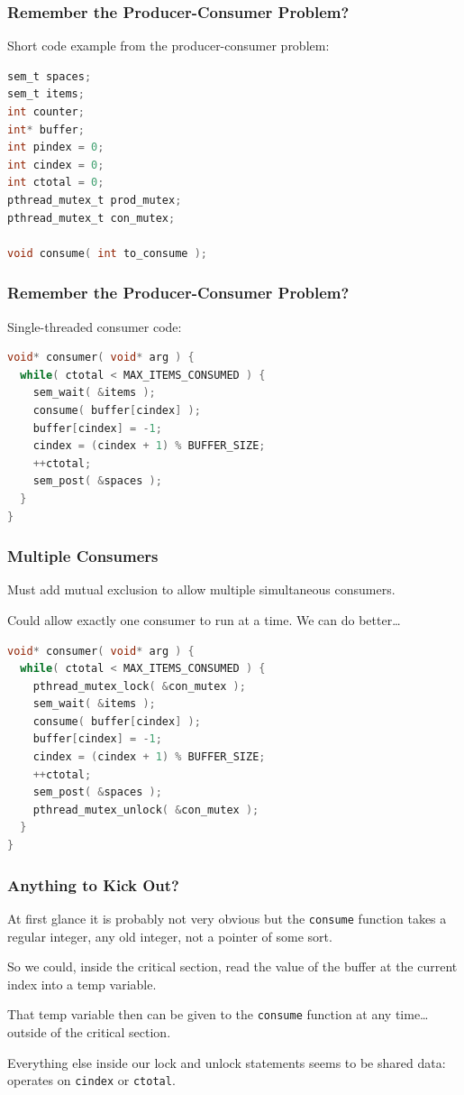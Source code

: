 \begin{frame}[fragile]
\frametitle{Remember the Producer-Consumer Problem?}

Short code example from the producer-consumer problem:

\begin{lstlisting}[language=C]
sem_t spaces;
sem_t items;
int counter;
int* buffer;
int pindex = 0;
int cindex = 0;
int ctotal = 0;
pthread_mutex_t prod_mutex;
pthread_mutex_t con_mutex;

void consume( int to_consume );

\end{lstlisting}


\end{frame}


\begin{frame}[fragile]
\frametitle{Remember the Producer-Consumer Problem?}

Single-threaded consumer code:

\begin{lstlisting}[language=C]
void* consumer( void* arg ) { 
  while( ctotal < MAX_ITEMS_CONSUMED ) {
    sem_wait( &items );
    consume( buffer[cindex] );
    buffer[cindex] = -1;
    cindex = (cindex + 1) % BUFFER_SIZE;
    ++ctotal;
    sem_post( &spaces );
  }
}
\end{lstlisting}


\end{frame}


\begin{frame}[fragile]
\frametitle{Multiple Consumers}
Must add mutual exclusion to allow multiple simultaneous consumers.

Could allow exactly one consumer to run at a time. We can do better\ldots

\begin{lstlisting}[language=C]
void* consumer( void* arg ) { 
  while( ctotal < MAX_ITEMS_CONSUMED ) {
    pthread_mutex_lock( &con_mutex );
    sem_wait( &items );
    consume( buffer[cindex] );
    buffer[cindex] = -1;
    cindex = (cindex + 1) % BUFFER_SIZE;
    ++ctotal;
    sem_post( &spaces );
    pthread_mutex_unlock( &con_mutex );
  }
}
\end{lstlisting}


\end{frame}


\begin{frame}
\frametitle{Anything to Kick Out?}

At first glance it is probably not very obvious but the \texttt{consume} function takes a regular integer, any old integer, not a pointer of some sort. 

So we could, inside the critical section, read the value of the buffer at the current index into a temp variable. 

That temp variable then can be given to the \texttt{consume} function at any time\ldots outside of the critical section. 

Everything else inside our lock and unlock statements seems to be shared data: operates on \texttt{cindex} or \texttt{ctotal}.


\end{frame}


